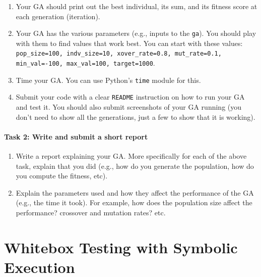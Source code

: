 \documentclass[oneside,11pt,dvipsnames]{book}
\newcommand{\code}[1]{\texttt{#1}}
\begin{document}
\begin{enumerate}
    \item Your GA should print out the best individual, its sum, and its fitness score at each generation (iteration).
    \item Your GA has the various parameters (e.g., inputs to the \code{ga}). You should play with them to find values that work best.  You can start with these values: \code{pop\_size=100, indv\_size=10, xover\_rate=0.8, mut\_rate=0.1, min\_val=-100, max\_val=100, target=1000}.
    \item Time your GA. You can use Python's \code{time} module for this.
    \item Submit your code with a clear \code{README} instruction on how to run your GA and test it. You should also submit screenshots of your GA running (you don't need to show all the generations, just a few to show that it is working).
\end{enumerate}

\paragraph{Task 2: Write and submit a short report}
\begin{enumerate}
\item Write a report explaining your GA. More specifically for each of the above task, explain that you did (e.g., how do you generate the population, how do you compute the fitness, etc).

\item Explain the parameters used and how they affect the performance of the GA (e.g., the time it took).  For example, how does the population size affect the performance? crossover and mutation rates? etc.

\end{enumerate}







\section{Whitebox Testing with Symbolic Execution}\label{sec:symbolic-execution}
\end{document}
